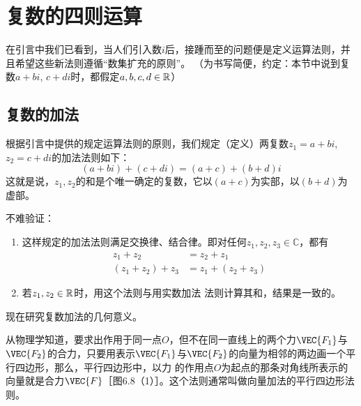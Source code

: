 \section{复数的四则运算}
在引言中我们已看到，当人们引入数$i$后，接踵而至的问题便是定义运算法则，并且希望这些新法则遵循“数集扩充的原则”。
（为书写简便，约定：本节中说到复数$a+bi$, $c+di$时，都假定$a,b,c,d\in\mathbb{R}$）

\subsection{复数的加法}
根据引言中提供的规定运算法则的原则，我们规定（定义）两复数$z_1=a+bi$, $z_2=c+di$的加法法则如下：
\begin{equation}
   (a+bi)+(c+di)=(a+c)+(b+d)i \tag{1}
\end{equation}
这就是说，$z_1,z_2$的和是个唯一确定的复数，它以$(a+c)$为实部，以$(b+d)$为虚部。

不难验证：
\begin{enumerate}
    \item 这样规定的加法法则满足交换律、结合律。即对任何$z_1,z_2,z_3\in\mathbb{C}$，都有
\[\begin{split}
    z_1+z_2&=z_2+z_1\\
(z_1+z_2)+z_3&=z_1+(z_2+z_3)    
\end{split}\]

\item 若$z_1,z_2\in\mathbb{R}$时，用这个法则与用实数加法 法则计算其和，结果是一致的。
\end{enumerate}

现在研究复数加法的几何意义。

从物理学知道，要求出作用于同一点$O$，但不在同一直线上的两个力$\VEC{F_1}$与$\VEC{F_2}$的合力，只要用表示$\VEC{F_1}$与$\VEC{F_2}$的向量为相邻的两边画一个平行四边形，那么，平行四边形中，以力
的作用点$O$为起点的那条对角线所表示的向量就是合力$\VEC{F}$［图6.8（1）］。这个法则通常叫做向量加法的平行四边形法则。

